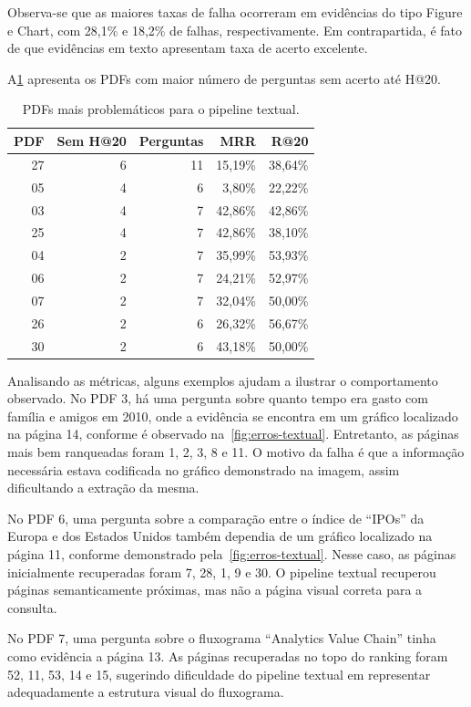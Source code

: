 Observa-se que as maiores taxas de falha ocorreram em evidências do tipo Figure e Chart, com 28,1\% e 18,2\% de falhas, respectivamente. Em contrapartida, é fato de que evidências em texto apresentam taxa de acerto excelente.

A\ref{tab:pdfs-problematicos-textual} apresenta os PDFs com maior número de perguntas sem acerto até H@20.

\begin{table}[htbp]
\centering
\caption{PDFs mais problemáticos para o pipeline textual.}
\label{tab:pdfs-problematicos-textual}
\small
\begin{tabular}{r r r r r}
\toprule
\textbf{PDF} & \textbf{Sem H@20} & \textbf{Perguntas} & \textbf{MRR} & \textbf{R@20} \\
\midrule
27 & 6 & 11 & 15,19\% & 38,64\% \\
05 & 4 & 6 & 3,80\% & 22,22\% \\
03 & 4 & 7 & 42,86\% & 42,86\% \\
25 & 4 & 7 & 42,86\% & 38,10\% \\
04 & 2 & 7 & 35,99\% & 53,93\% \\
06 & 2 & 7 & 24,21\% & 52,97\% \\
07 & 2 & 7 & 32,04\% & 50,00\% \\
26 & 2 & 6 & 26,32\% & 56,67\% \\
30 & 2 & 6 & 43,18\% & 50,00\% \\
\bottomrule
\end{tabular}
\end{table}

Analisando as métricas, alguns exemplos ajudam a ilustrar o comportamento observado. No PDF 3, há uma pergunta sobre quanto tempo era gasto com família e amigos em 2010, onde a evidência se encontra em um gráfico localizado na página 14, conforme é observado na~\ref{fig:erros-textual}. Entretanto, as páginas mais bem ranqueadas foram 1, 2, 3, 8 e 11. O motivo da falha é que a informação necessária estava codificada no gráfico demonstrado na imagem, assim dificultando a extração da mesma.

No PDF 6, uma pergunta sobre a comparação entre o índice de ``IPOs'' da Europa e dos Estados Unidos também dependia de um gráfico localizado na página 11, conforme demonstrado pela~\ref{fig:erros-textual}. Nesse caso, as páginas inicialmente recuperadas foram 7, 28, 1, 9 e 30. O pipeline textual recuperou páginas semanticamente próximas, mas não a página visual correta para a consulta.

No PDF 7, uma pergunta sobre o fluxograma ``Analytics Value Chain'' tinha como evidência a página 13. As páginas recuperadas no topo do ranking foram 52, 11, 53, 14 e 15, sugerindo dificuldade do pipeline textual em representar adequadamente a estrutura visual do fluxograma.

